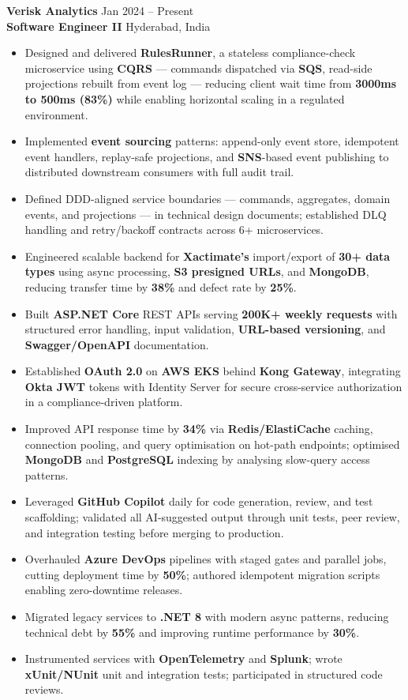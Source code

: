 \documentclass[letterpaper,10pt]{article}
\begin{document}
\textbf{Verisk Analytics} \hfill Jan 2024 -- Present \\
\textbf{Software Engineer II} \hfill Hyderabad, India

\begin{itemize}[leftmargin=*]
    \item Designed and delivered \textbf{RulesRunner}, a stateless compliance-check microservice using \textbf{CQRS} — commands dispatched via \textbf{SQS}, read-side projections rebuilt from event log — reducing client wait time from \textbf{3000ms to 500ms (83\%)} while enabling horizontal scaling in a regulated environment.
    \item Implemented \textbf{event sourcing} patterns: append-only event store, idempotent event handlers, replay-safe projections, and \textbf{SNS}-based event publishing to distributed downstream consumers with full audit trail.
    \item Defined DDD-aligned service boundaries — commands, aggregates, domain events, and projections — in technical design documents; established DLQ handling and retry/backoff contracts across 6+ microservices.
    \item Engineered scalable backend for \textbf{Xactimate's} import/export of \textbf{30+ data types} using async processing, \textbf{S3 presigned URLs}, and \textbf{MongoDB}, reducing transfer time by \textbf{38\%} and defect rate by \textbf{25\%}.
    \item Built \textbf{ASP.NET Core} REST APIs serving \textbf{200K+ weekly requests} with structured error handling, input validation, \textbf{URL-based versioning}, and \textbf{Swagger/OpenAPI} documentation.
    \item Established \textbf{OAuth 2.0} on \textbf{AWS EKS} behind \textbf{Kong Gateway}, integrating \textbf{Okta JWT} tokens with Identity Server for secure cross-service authorization in a compliance-driven platform.
    \item Improved API response time by \textbf{34\%} via \textbf{Redis/ElastiCache} caching, connection pooling, and query optimisation on hot-path endpoints; optimised \textbf{MongoDB} and \textbf{PostgreSQL} indexing by analysing slow-query access patterns.
    \item Leveraged \textbf{GitHub Copilot} daily for code generation, review, and test scaffolding; validated all AI-suggested output through unit tests, peer review, and integration testing before merging to production.
    \item Overhauled \textbf{Azure DevOps} pipelines with staged gates and parallel jobs, cutting deployment time by \textbf{50\%}; authored idempotent migration scripts enabling zero-downtime releases.
    \item Migrated legacy services to \textbf{.NET 8} with modern async patterns, reducing technical debt by \textbf{55\%} and improving runtime performance by \textbf{30\%}.
    \item Instrumented services with \textbf{OpenTelemetry} and \textbf{Splunk}; wrote \textbf{xUnit/NUnit} unit and integration tests; participated in structured code reviews.
\end{itemize}
\end{document}
